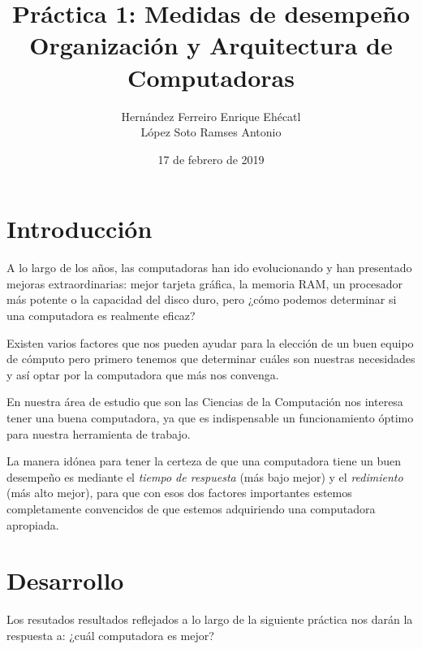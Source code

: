 \documentclass[12pt, letterpaper]{article}
\author{Hernández Ferreiro Enrique Ehécatl \\
          López Soto Ramses Antonio}
\title{Práctica 1: Medidas de desempeño \\
                {\small Organización y Arquitectura de Computadoras}}
\date{17 de febrero de 2019}
\begin{document}
        \maketitle

        \section{Introducción}

                \hspace{.5cm}
                A lo largo de los años, las computadoras han ido evolucionando
                y han presentado mejoras extraordinarias: mejor tarjeta gráfica,
                la memoria RAM, un procesador más potente o la capacidad del 
                disco duro, pero ¿cómo podemos determinar si una computadora es 
                realmente eficaz?\vspace{.3cm}

                Existen varios factores que nos pueden ayudar para la elección 
                de un buen equipo de cómputo pero primero tenemos que determinar 
                cuáles son nuestras necesidades y así optar por la computadora 
                que más nos convenga.\vspace{.3cm}

                En nuestra área de estudio que son las Ciencias de la Computación
                nos interesa tener una buena computadora, ya que es indispensable 
                un funcionamiento óptimo para nuestra herramienta de trabajo.\vspace{.3cm}

                La manera idónea para tener la certeza de que una computadora tiene
                un buen desempeño es mediante el \textit{tiempo de respuesta} 
                (más bajo mejor) y el \textit{redimiento} (más alto mejor), para 
                que con esos dos factores importantes estemos completamente 
                convencidos de que estemos adquiriendo una computadora apropiada.\vspace{.3cm}

        \section{Desarrollo}

                \hspace{.5cm}
                Los resutados resultados reflejados a lo largo de la siguiente 
                práctica nos darán la respuesta a: ¿cuál computadora es mejor?
\end{document}
